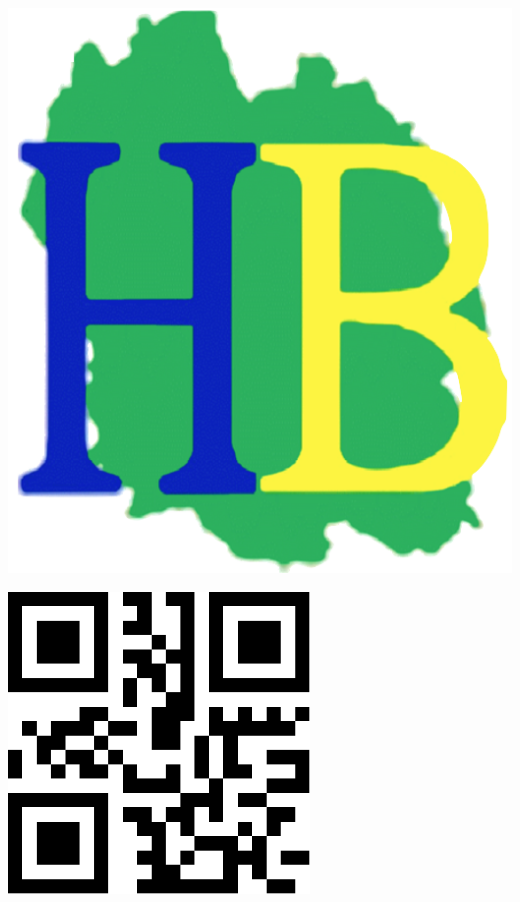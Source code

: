 \documentclass[a4paper,11pt,fleqn]{article}
\begin{document}
\Huge

\begin{block} %
{}\hfill {}
{}\hfill {}
\begin{minipage}{0.15\linewidth}
\includegraphics[width=\textwidth]{logo-HB.png}
\end{minipage}
{}\hfill {}



\begin{minipage}{0.48\linewidth}
\includegraphics[width=8cm]{QRcodes/763.pdf}
\end{minipage}
\begin{minipage}{0.5\linewidth}
{}\hfill {}
{}\hfill {}
\end{minipage}



\end{block}
\end{document}
